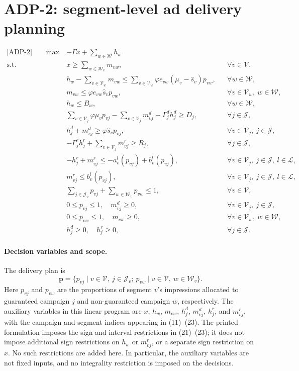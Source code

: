 \documentclass{article}
\begin{document}
\section*{ADP-2: segment-level ad delivery planning}
\begin{align}
\text{[ADP-2]}\qquad \max\quad &-\Gamma x+\sum_{w\in\mathcal W}h_w \tag{10}\\
\text{s.t.}\qquad &x\geq\sum_{w\in\mathcal W_v}m_{vw}, &&\forall v\in\mathcal V, \tag{11}\\
&h_w-\sum_{v\in\mathcal V_w}m_{vw}\leq\sum_{v\in\mathcal V_w}\varphi e_{vw}(\mu_v-\hat s_v)p_{vw}, &&\forall w\in\mathcal W, \tag{12}\\
&m_{vw}\leq\varphi e_{vw}\hat s_vp_{vw}, &&\forall v\in\mathcal V_w,\ w\in\mathcal W, \tag{13}\\
&h_w\leq B_w, &&\forall w\in\mathcal W, \tag{14}\\
&\sum_{v\in\mathcal V_j}\varphi\mu_vp_{vj}-\sum_{v\in\mathcal V_j}m^d_{vj}-\Gamma^d_jh^d_j\geq D_j, &&\forall j\in\mathcal J, \tag{15}\\
&h^d_j+m^d_{vj}\geq\varphi\hat s_vp_{vj}, &&\forall v\in\mathcal V_j,\ j\in\mathcal J, \tag{16}\\
&-\Gamma^r_jh^r_j+\sum_{v\in\mathcal V_j}m^r_{vj}\geq R_j, &&\forall j\in\mathcal J, \tag{17}\\
&-h^r_j+m^r_{vj}\leq-a^l_v(p_{vj})+b^l_v(p_{vj}), &&\forall v\in\mathcal V_j,\ j\in\mathcal J,\ l\in\mathcal L, \tag{18}\\
&m^r_{vj}\leq b^l_v(p_{vj}), &&\forall v\in\mathcal V_j,\ j\in\mathcal J,\ l\in\mathcal L, \tag{19}\\
&\sum_{j\in\mathcal J_v}p_{vj}+\sum_{w\in\mathcal W_v}p_{vw}\leq1, &&\forall v\in\mathcal V, \tag{20}\\
&0\leq p_{vj}\leq1,\quad m^d_{vj}\geq0, &&\forall v\in\mathcal V_j,\ j\in\mathcal J, \tag{21}\\
&0\leq p_{vw}\leq1,\quad m_{vw}\geq0, &&\forall v\in\mathcal V_w,\ w\in\mathcal W, \tag{22}\\
&h^d_j\geq0,\quad h^r_j\geq0, &&\forall j\in\mathcal J. \tag{23}
\end{align}

\paragraph{Decision variables and scope.}
The delivery plan is
\[
\boldsymbol p=\{p_{vj}\mid v\in\mathcal V,\ j\in\mathcal J_v;\ p_{vw}\mid v\in\mathcal V,\ w\in\mathcal W_v\}.
\]
Here $p_{vj}$ and $p_{vw}$ are the proportions of segment $v$'s impressions allocated to guaranteed campaign $j$ and non-guaranteed campaign $w$, respectively. The auxiliary variables in this linear program are $x$, $h_w$, $m_{vw}$, $h^d_j$, $m^d_{vj}$, $h^r_j$, and $m^r_{vj}$, with the campaign and segment indices appearing in (11)--(23). The printed formulation imposes the sign and interval restrictions in (21)--(23); it does not impose additional sign restrictions on $h_w$ or $m^r_{vj}$, or a separate sign restriction on $x$. No such restrictions are added here. In particular, the auxiliary variables are not fixed inputs, and no integrality restriction is imposed on the decisions.
\end{document}
